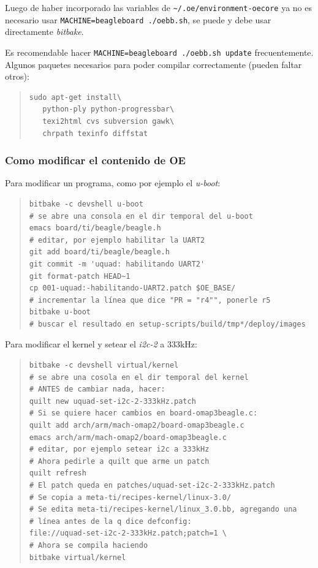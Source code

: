 \documentclass[main]{subfiles}
\begin{document}
Luego de haber incorporado las variables de \verb+~/.oe/environment-oecore+ ya no es necesario usar \verb+MACHINE=beagleboard ./oebb.sh+, se puede y debe usar directamente \textit{bitbake}.

Es recomendable hacer \verb+MACHINE=beagleboard ./oebb.sh update+ frecuentemente.
Algunos paquetes necesarios para poder compilar correctamente (pueden faltar otros):
\begin{quote}
\begin{verbatim}
sudo apt-get install\
   python-ply python-progressbar\
   texi2html cvs subversion gawk\
   chrpath texinfo diffstat
\end{verbatim}
\end{quote}

\subsubsection{Como modificar el contenido de OE}
\label{sec:codigo:como-modificar-el-contenido-de-oe}

Para modificar un programa, como por ejemplo el \textit{u-boot}:
\begin{quote}
\begin{verbatim}
bitbake -c devshell u-boot
# se abre una consola en el dir temporal del u-boot
emacs board/ti/beagle/beagle.h
# editar, por ejemplo habilitar la UART2
git add board/ti/beagle/beagle.h
git commit -m 'uquad: habilitando UART2'
git format-patch HEAD~1
cp 001-uquad:-habilitando-UART2.patch $OE_BASE/
# incrementar la línea que dice "PR = "r4"", ponerle r5
bitbake u-boot
# buscar el resultado en setup-scripts/build/tmp*/deploy/images
\end{verbatim}
\end{quote}

Para modificar el kernel y setear el \textit{i2c-2} a 333kHz:

\begin{quote}
\begin{verbatim}
bitbake -c devshell virtual/kernel
# se abre una cosola en el dir temporal del kernel
# ANTES de cambiar nada, hacer:
quilt new uquad-set-i2c-2-333kHz.patch
# Si se quiere hacer cambios en board-omap3beagle.c:
quilt add arch/arm/mach-omap2/board-omap3beagle.c
emacs arch/arm/mach-omap2/board-omap3beagle.c
# editar, por ejemplo setear i2c a 333kHz
# Ahora pedirle a quilt que arme un patch
quilt refresh
# El patch queda en patches/uquad-set-i2c-2-333kHz.patch
# Se copia a meta-ti/recipes-kernel/linux-3.0/
# Se edita meta-ti/recipes-kernel/linux_3.0.bb, agregando una
# línea antes de la q dice defconfig:
file://uquad-set-i2c-2-333kHz.patch;patch=1 \
# Ahora se compila haciendo
bitbake virtual/kernel
\end{verbatim}
\end{quote}
\end{document}
